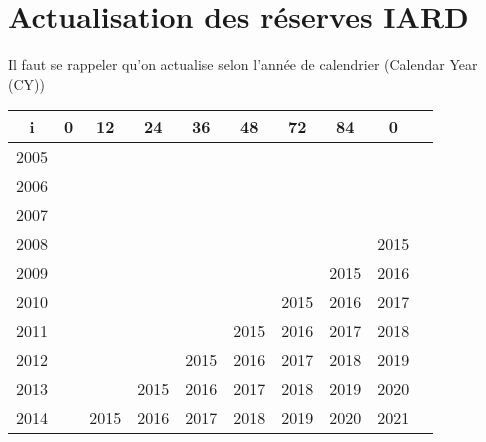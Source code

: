 \documentclass[11pt,french]{report}
\begin{document}
\section{Actualisation des réserves IARD}
Il faut se rappeler qu'on actualise selon l'année de calendrier (Calendar Year (CY))

\begin{center}
\begin{tabular}{|c|c|c|c|c|c|c|c|c|c|}
  \hline
   i & 0 & 12 & 24 & 36 & 48 & 72 & 84 & 0  \\
  \hline
  2005 & & & & & & & & \\
  2006 & & & & & & & & \\
  2007 & & & & & & & & \\
  2008 & & & & & & & & 2015 \\
  2009 & & & & & & & 2015 & 2016 \\
  2010 & & & & & & 2015 & 2016 & 2017 \\
  2011 & & & & & 2015 & 2016 & 2017 & 2018 \\
  2012 & & & & 2015 & 2016 & 2017 & 2018 & 2019  \\
  2013 & & & 2015 & 2016 & 2017 & 2018 & 2019 & 2020  \\
  2014 & & 2015 & 2016 & 2017 & 2018 & 2019 & 2020 & 2021  \\
  \hline
\end{tabular}
\end{center}
\end{document}
